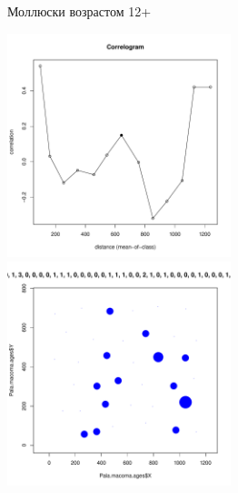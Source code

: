 	\begin{figure}[h]

	\begin{minipage}[b]{\linewidth}
	\begin{center}
		Моллюски возрастом 12+
	\end{center}
	\end{minipage}
	
	\begin{minipage}[b]{.46\linewidth}
	\begin{center}
		\includegraphics[width=65mm]{../Barenc_Sea/distribution_Moran/Pala_macoma_age_N12_.pdf}
	\end{center}
	\end{minipage}
	\hfil %
	\begin{minipage}[b]{.46\linewidth}
	\begin{center}
		\includegraphics[width=65mm]{../Barenc_Sea/distribution_Moran/Pala_macoma_age_bubb_N12_.pdf}
	\end{center}
	\end{minipage}


\end{figure}
